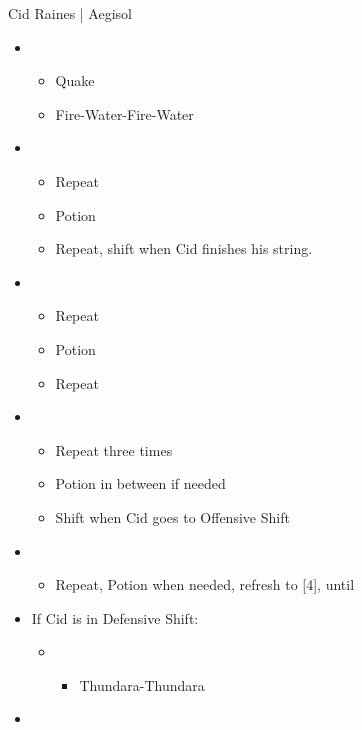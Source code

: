 	\begin{battle}[1:40]{Cid Raines | Aegisol}
	\begin{multicols}{2}
		\begin{itemize}
			\item \first
			      \begin{itemize}
				      \item Quake
				      \item Fire-Water-Fire-Water
			      \end{itemize}
			\item \third
			      \begin{itemize}
				      \item Repeat
				      \item Potion
				      \item Repeat, shift when Cid finishes his string.
			      \end{itemize}
			\item \fifth
			      \begin{itemize}
				      \item Repeat
				      \item Potion
				      \item Repeat
			      \end{itemize}
			\item \second
			      \begin{itemize}
				      \item Repeat three times
				      \item Potion in between if needed
				      \item Shift when Cid goes to Offensive Shift
			      \end{itemize}
			\item \third
			      \begin{itemize}
				      \item Repeat, Potion when needed, refresh to [4], until \stagger
			      \end{itemize}
			\item If Cid is in Defensive Shift:
			      \begin{itemize}
				      \item \second
				            \begin{itemize}
					            \item Thundara-Thundara
				            \end{itemize}
			      \end{itemize}
			\item \sixth
			      \begin{itemize}

\end{itemize}
\end{itemize}
\end{multicols}
\end{battle}
